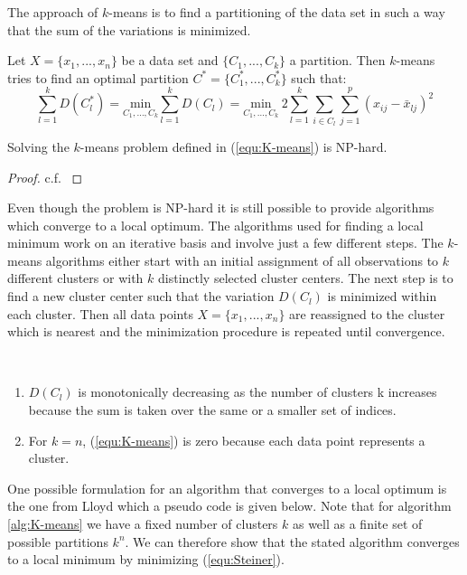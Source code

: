 The approach of $k$-means is to find a partitioning of the data set in such a way that the sum of the variations is minimized.

\begin{definition}[$k$-means]
Let $X = \{x_1, ..., x_n\}$ be a data set and $\{C_1, ..., C_k\}$ a partition. Then $k$-means tries to find an optimal partition $C^* = \{C_1^*, ..., C_k^*\}$ such that: 
	\begin{equation}\label{equ:K-means}
		\sum_{l=1}^k D(C_l^*) = \underset{C_1, \dots, C_k}{\text{min}} \sum_{l=1}^k D(C_l) = \underset{C_1, \dots, C_k}{\text{min}} ~2 \sum_{l=1}^k  \sum_{i \in C_l} \sum_{j=1}^p (x_{ij}- \bar x_{lj})^2
	\end{equation}
\end{definition}

\begin{corollary}
	Solving the $k$-means problem defined in (\ref{equ:K-means}) is NP-hard.
\end{corollary}
\begin{proof}
c.f. \cite{NP_hard}
\end{proof}

Even though the problem is NP-hard it is still possible to provide algorithms which converge to a local optimum. The algorithms used for finding a local minimum work on an iterative basis   and involve just a few different steps. The $k$-means algorithms either start with an initial assignment of all observations to $k$ different clusters or with $k$ distinctly selected cluster centers. The next step is to find a new cluster center such that the variation $D(C_l)$ is minimized within each cluster. Then all data points $X = \{x_1, ..., x_n\}$ are reassigned to the cluster which is nearest and the minimization procedure is repeated until convergence. 

\begin{remark}~
	\begin{enumerate}[label=(\roman*)]
		\item $D(C_l)$ is monotonically decreasing as the number of clusters k increases because the sum is taken over the same or a smaller set of indices. 
		\item  For $k=n$, (\ref{equ:K-means}) is zero because each data point represents a cluster. 
	\end{enumerate}
\end{remark}

One possible formulation for an algorithm that converges to a local optimum is the one from Lloyd \cite{lloyd1982least} which a pseudo code is given below. Note that for algorithm \ref{alg:K-means} we have a fixed number of clusters $k$ as well as a finite set of possible partitions $k^n$. We can therefore show that the stated algorithm converges to a local minimum by minimizing (\ref{equ:Steiner}).

